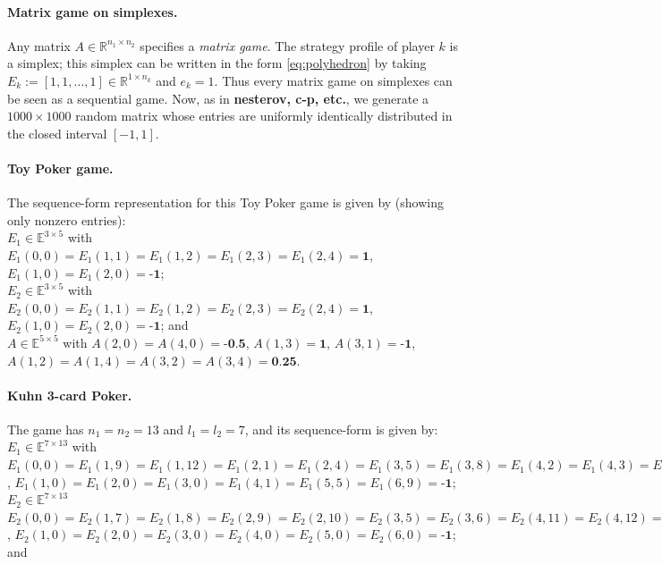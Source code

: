 \documentclass[envcountsame]{llcns2e/llncs}
\begin{document}
\paragraph{\textbf{Matrix game on simplexes.}}
Any matrix $A \in \mathbb{R}^{n_1 \times n_2}$ specifies a
\textit{matrix game}. The strategy profile of player $k$ is a simplex;
this simplex can be written in the form \eqref{eq:polyhedron} by
taking $E_k := [1, 1, ..., 1] \in \mathbb{R}^{1 \times n_k}$ and $e_k
= 1$. Thus every matrix game on simplexes can be seen as a sequential
game. Now, as in \textbf{nesterov, c-p, etc.}, we generate a $1000
\times 1000$ random matrix whose entries are uniformly identically
distributed in the closed interval $[-1, 1]$.

\paragraph{\textbf{Toy Poker game.}}
The sequence-form representation for this Toy Poker game is given by
(showing only nonzero entries):\\

$E_1 \in \mathbb{E}^{3 \times 5}$ with $E_1(0,0) = E_1(1,1) =
E_1(1,2) = E_1(2,3) = E_1(2,4) = \textbf{1}$,
$E_1(1,0) = E_1(2,0) = \textbf{-1}$; \\

$E_2 \in \mathbb{E}^{3 \times 5}$ with $E_2(0,0) = E_2(1,1) = E_2(1,2)
= E_2(2,3) = E_2(2,4) = \textbf{1}$, $E_2(1,0) = E_2(2,0) =
\textbf{-1}$; and \\

$A \in \mathbb{E}^{5 \times 5}$ with $A(2,0) =
A(4,0) = \textbf{-0.5}$, $A(1,3) = \textbf{1}$, $A(3,1) =
\textbf{-1}$, $A(1,2) = A(1,4) = A(3,2) = A(3,4) = \textbf{0.25}$.


\paragraph{\textbf{Kuhn 3-card Poker.}}
The game has $n_1 = n_2 = 13$ and $l_1 = l_2 = 7$, and its
sequence-form is given by:\\

$E_1 \in \mathbb{E}^{7 \times 13}$ with $E_1(0,0) = E_1(1,9) =
E_1(1,12) = E_1(2,1) = E_1(2,4) = E_1(3,5) =
E_1(3,8) = E_1(4,2) = E_1(4,3) = E_1(5,6) = E_1(5,7) = E_1(6,10) =
E_1(6,11) = \textbf{1}$, $E_1(1,0) = E_1(2,0) = E_1(3,0) = E_1(4,1) =
E_1(5,5) = E_1(6,9) = \textbf{-1}$; \\

 $E_2 \in \mathbb{E}^{7 \times 13}$
$E_2(0,0) = E_2(1,7) = E_2(1,8) = E_2(2,9) = E_2(2,10) = E_2(3,5) =
E_2(3,6) = E_2(4,11) = E_2(4,12) = E_2(5,1) = E_2(5,2) = E_2(6,3) =
E_2(6,4) = \textbf{1}$, $E_2(1,0) = E_2(2,0) = E_2(3,0) = E_2(4,0) =
E_2(5,0) = E_2(6,0) = \textbf{-1}$; and \\
\end{document}
